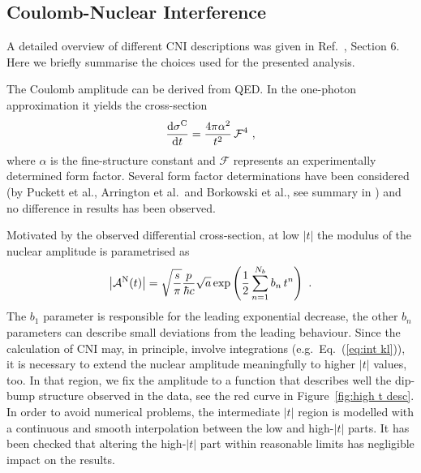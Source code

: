 \subsection{Coulomb-Nuclear Interference}
\label{sec:rho cni}

A detailed overview of different CNI descriptions was given in Ref.~\cite{totem-8tev-1km}, Section 6. Here we briefly summarise the choices used for the presented analysis.

The Coulomb amplitude can be derived from QED. In the one-photon approximation it yields the cross-section
\begin{equation}
\label{eq:coul cs}
	{{\rm d}\sigma^{\rm C}\over {\rm d}t} = {4\pi\alpha^2\over t^2}\,{\mathcal{F}}^4\ ,
\end{equation}
where $\alpha$ is the fine-structure constant and $\mathcal{F}$ represents an experimentally determined form factor. Several form factor determinations have been considered (by Puckett et al., Arrington et al.~and Borkowski et al., see summary in \cite{elegent}) and no difference in results has been observed.

Motivated by the observed differential cross-section, at low $|t|$ the modulus of the nuclear amplitude is parametrised as
\begin{equation}
\label{eq:nuc mod}
\left | {\cal A}^{\rm N}(t) \right | = \sqrt{s\over\pi} {p\over \hbar c} \sqrt{a} \exp\left( {1\over 2} \sum\limits_{n = 1}^{N_b} b_n\, t^n \right)\ .
\end{equation}
The $b_1$ parameter is responsible for the leading exponential decrease, the other $b_n$ parameters can describe small deviations from the leading behaviour. Since the calculation of CNI may, in principle, involve integrations (e.g.~Eq.~(\ref{eq:int kl})), it is necessary to extend the nuclear amplitude meaningfully to higher $|t|$ values, too. In that region, we fix the amplitude to a function that describes well the dip-bump structure observed in the data, see the red curve in Figure~\ref{fig:high t desc}. In order to avoid numerical problems, the intermediate $|t|$ region is modelled with a continuous and smooth interpolation between the low and high-$|t|$ parts. It has been checked that altering the high-$|t|$ part within reasonable limits has negligible impact on the results.

